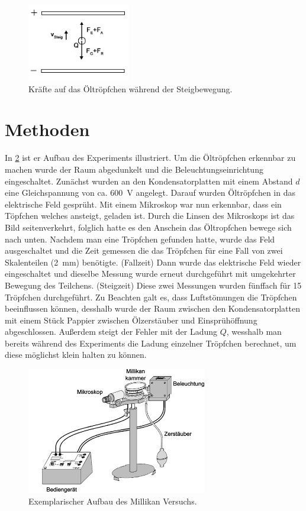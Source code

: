 \documentclass[
	a4paper,
	12pt,
	pagesize,
	ngerman
]{scrartcl}
\begin{document}
	\begin{figure}[H]
		\includegraphics[width=0.4\textwidth]{steig}
		\centering
		\caption{Kräfte auf das Öltröpfchen während der Steigbewegung.\cite{RCL}}
		\label{steig}
		\centering
	\end{figure} 
	\section{Methoden}
	In \cref{Millikan} ist er Aufbau des Experiments illustriert.
	Um die Öltröpfchen erkennbar zu machen wurde der Raum abgedunkelt und die Beleuchtungseinrichtung eingeschaltet.
	Zunächst wurden an den Kondensatorplatten mit einem Abstand $d$ eine Gleichspannung von ca. \SI{600}{V} angelegt. 
	Darauf wurden Öltröpfchen in das elektrische Feld gesprüht.
	Mit einem Mikroskop war nun erkennbar, dass ein Töpfchen welches ansteigt, geladen ist. 
	Durch die Linsen des Mikroskops ist das Bild seitenverkehrt, folglich hatte es den Anschein das Öltropfchen bewege sich nach unten. 
	Nachdem man eine Tröpfchen gefunden hatte, wurde das Feld ausgeschaltet und die Zeit gemessen die das Tröpfchen für eine Fall von zwei Skalenteilen (\SI{2}{mm}) benötigte. (Fallzeit)
	Dann wurde das elektrische Feld wieder eingeschaltet und dieselbe Messung wurde erneut durchgeführt mit umgekehrter Bewegung des Teilchens. (Steigzeit)
	Diese zwei Messungen wurden fünffach für 15 Tröpfchen durchgeführt. 
	Zu Beachten galt es, dass Luftstömungen die Tröpfchen beeinflussen können, desshalb wurde der Raum zwischen den Kondensatorplatten mit einem Stück Pappier zwischen Ölzerstäuber und Einsprühöffnung abgeschlossen.
	Außerdem steigt der Fehler mit der Ladung $Q$, wesshalb man bereits während des Experiments die Ladung einzelner Tröpfchen berechnet, um diese möglichst klein halten zu können.


	\begin{figure}[H]
		\includegraphics[width=0.7\textwidth]{Millikan}
		\centering
		\caption{Exemplarischer Aufbau des Millikan Versuchs.\cite{TUM} }
		\label{Millikan}
		\centering
	\end{figure} 
\end{document}
